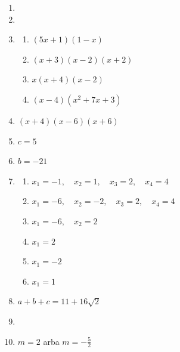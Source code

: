 \documentclass[12pt, a4paper]{scrartcl}
\begin{document}
\begin{enumerate}[label=\textbf{\arabic* užduotis.}, leftmargin=*]
    \item \mbox{}
    \item \mbox{}
    \item
    \begin{enumerate}[label={(\arabic*)}]
        \item $(5x+1)(1-x)$
        \item $(x+3)(x-2)(x+2)$
        \item $x(x+4)(x-2)$
        \item $(x-4)(x^2+7x+3)$
    \end{enumerate}
    \item $(x+4)(x-6)(x+6)$
    \item $c=5$
    \item $b=-21$
    \item
    \begin{enumerate}[label={(\arabic*)}]
        \item $x_1=-1,\quad x_2=1,\quad x_3=2,\quad x_4=4$
        \item $x_1=-6,\quad x_2=-2,\quad x_3=2,\quad x_4=4$
        \item $x_1=-6,\quad x_2=2$
        \item $x_1=2$
        \item $x_1=-2$
        \item $x_1=1$
    \end{enumerate}
    \item $a+b+c=11+16\sqrt2$
    \item \mbox{}
    \item $m=2$ arba $m=-\frac52$
\end{enumerate}
\end{document}
